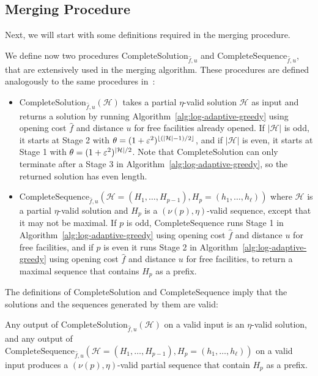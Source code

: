 \subsection{Merging Procedure}

Next, we will start with some definitions required in the merging procedure.

We define now two procedures $\mathrm{CompleteSolution}_{\hat f,u}$ and $\mathrm{CompleteSequence}_{\hat f,u}$, that are extensively used in the merging algorithm.
These procedures are defined analogously to the same procedures in~\cite{MR4928455-Cohen25}:

\begin{itemize}
    \item $\mathrm{CompleteSolution}_{\hat f,u}(\mathcal{H})$ takes a partial $\eta$-valid solution $\mathcal{H}$ as input and returns a solution by running Algorithm~\ref{alg:log-adaptive-greedy} using opening cost $\hat f$ and distance $u$ for free facilities already opened.
    If $|\mathcal{H}|$ is odd, it starts at Stage 2 with $\theta = (1+\varepsilon^2)^{\lfloor (|\mathcal{H}| - 1) / 2 \rfloor}$, and if $|\mathcal{H}|$ is even, it starts at Stage 1 with $\theta = (1+\varepsilon^2)^{|\mathcal{H}| / 2}$.
    Note that $\mathrm{CompleteSolution}$ can only terminate after a Stage 3 in Algorithm~\ref{alg:log-adaptive-greedy}, so the returned solution has even length.
    \item $\mathrm{CompleteSequence}_{\hat f,u}(\mathcal{H}=(H_1, \ldots, H_{p-1}),H_p = (h_1, \ldots, h_\ell))$ where $\mathcal{H}$ is a partial $\eta$-valid solution and $H_p$ is a $(\nu(p), \eta)$-valid sequence, except that it may not be maximal.
    If $p$ is odd, $\mathrm{CompleteSequence}$ runs Stage 1 in Algorithm~\ref{alg:log-adaptive-greedy} using opening cost $\hat f$ and distance $u$ for free facilities, and if $p$ is even it runs Stage 2 in Algorithm~\ref{alg:log-adaptive-greedy} using opening cost $\hat f$ and distance $u$ for free facilities, to return a maximal sequence that contains $H_p$ as a prefix.
\end{itemize}

The definitions of $\mathrm{CompleteSolution}$ and $\mathrm{CompleteSequence}$ imply that the solutions and the sequences generated by them are valid:

\begin{observation}
\label{obs:alg-valid}
Any output of $\mathrm{CompleteSolution}_{\hat f,u}(\mathcal{H})$ on a valid input is an $\eta$-valid solution,
and any output of $\mathrm{CompleteSequence}_{\hat f,u}(\mathcal{H}=(H_1, \ldots, H_{p-1}),H_p = (h_1, \ldots, h_\ell))$ on a valid input produces a $(\nu(p),\eta)$-valid partial sequence that contain $H_p$ as a prefix.
\end{observation}

